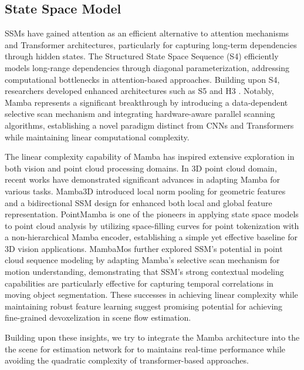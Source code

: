 \subsection{State Space Model}
SSMs \cite{ssm2,ssm3,ssm5} have gained attention as an efficient alternative to attention mechanisms and Transformer architectures, particularly for capturing long-term dependencies through hidden states. The Structured State Space Sequence (S4) \cite{ssm2} efficiently models long-range dependencies through diagonal parameterization, addressing computational bottlenecks in attention-based approaches. Building upon S4, researchers developed enhanced architectures such as S5 \cite{ssm3} and H3 \cite{ssm5}. Notably, Mamba \cite{gu2023mamba} represents a significant breakthrough by introducing a data-dependent selective scan mechanism and integrating hardware-aware parallel scanning algorithms, establishing a novel paradigm distinct from CNNs and Transformers while maintaining linear computational complexity.

The linear complexity capability of Mamba has inspired extensive exploration in both vision \cite{visionmamba,efficientvmamba} and point cloud processing \cite{mamba3d,liang2024pointmamba,mambamos} domains. In 3D point cloud domain, recent works have demonstrated significant advances in adapting Mamba for various tasks. Mamba3D \cite{mamba3d} introduced local norm pooling for geometric features and a bidirectional SSM design for enhanced both local and global feature representation. PointMamba \cite{liang2024pointmamba} is one of the pioneers in applying state space models to point cloud analysis by utilizing space-filling curves for point tokenization with a non-hierarchical Mamba encoder, establishing a simple yet effective baseline for 3D vision applications. 
MambaMos \cite{mambamos} further explored SSM's potential in point cloud sequence modeling by adapting Mamba's selective scan mechanism for motion understanding, demonstrating that SSM's strong contextual modeling capabilities are particularly effective for capturing temporal correlations in moving object segmentation. These successes in achieving linear complexity while maintaining robust feature learning suggest promising potential for achieving fine-grained devoxelization in scene flow estimation.

Building upon these insights, we try to integrate the Mamba architecture into the the scene for estimation network for to maintains real-time performance while avoiding the quadratic complexity of transformer-based approaches.
